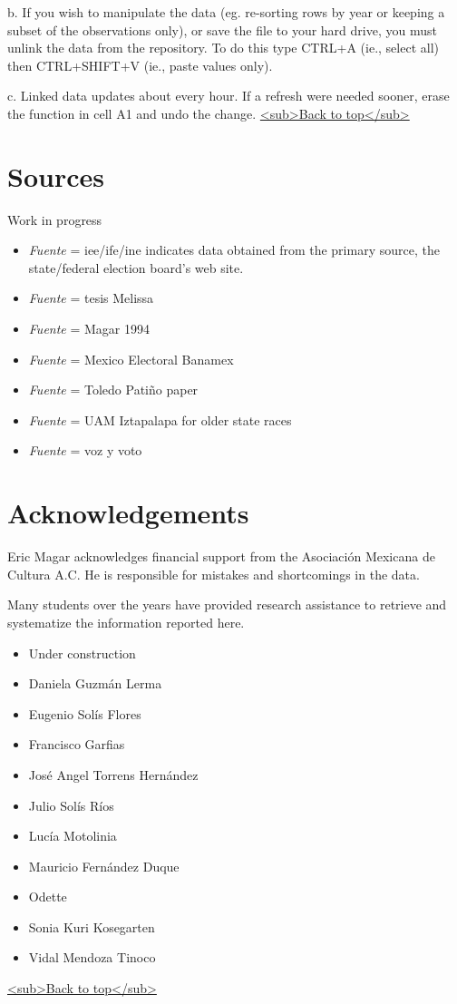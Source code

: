 \documentclass[11pt]{article}
\begin{document}
b. If you wish to manipulate the data (eg. re-sorting rows by year or keeping a subset of the observations only), or save the file to your hard drive, you must unlink the data from the repository. To do this type CTRL+A (ie., select all) then CTRL+SHIFT+V (ie., paste values only). 

c. Linked data updates about every hour. If a refresh were needed sooner, erase the function in cell A1 and undo the change. 
\hyperref[org5520298]{<sub>Back to top</sub>}
\section{Sources}
\label{sec:orgc5e4660}
Work in progress
\begin{itemize}
\item \emph{Fuente} = iee/ife/ine indicates data obtained from the primary source, the state/federal election board's web site.
\item \emph{Fuente} = tesis Melissa
\item \emph{Fuente} = Magar 1994
\item \emph{Fuente} = Mexico Electoral Banamex
\item \emph{Fuente} = Toledo Patiño paper
\item \emph{Fuente} = UAM Iztapalapa for older state races
\item \emph{Fuente} = voz y voto
\end{itemize}
\section{Acknowledgements}
\label{sec:orgea78457}
Eric Magar acknowledges financial support from the Asociación Mexicana de Cultura A.C. He is responsible for mistakes and shortcomings in the data. 

Many students over the years have provided research assistance to retrieve and systematize the information reported here. 
\begin{itemize}
\item Under construction
\item Daniela Guzmán Lerma
\item Eugenio Solís Flores
\item Francisco Garfias
\item José Angel Torrens Hernández
\item Julio Solís Ríos
\item Lucía Motolinia
\item Mauricio Fernández Duque
\item Odette
\item Sonia Kuri Kosegarten
\item Vidal Mendoza Tinoco
\end{itemize}
\hyperref[org5520298]{<sub>Back to top</sub>}
\end{document}
